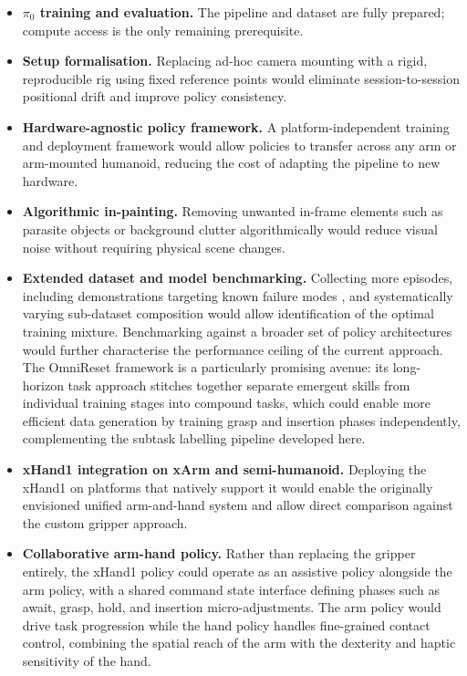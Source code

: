 \documentclass[conference]{IEEEtran}
\begin{document}
\begin{itemize}
    \item \textbf{$\pi_0$ training and evaluation.} The pipeline and dataset are fully prepared; compute access is the only remaining prerequisite.
    
    \item \textbf{Setup formalisation.} Replacing ad-hoc camera mounting with a rigid, reproducible rig using fixed reference points would eliminate session-to-session positional drift and improve policy consistency.

     \item \textbf{Hardware-agnostic policy framework.} A platform-independent training and deployment framework would allow policies to transfer across any arm or arm-mounted humanoid, reducing the cost of adapting the pipeline to new hardware.
    
    \item \textbf{Algorithmic in-painting.} Removing unwanted in-frame elements such as parasite objects or background clutter algorithmically would reduce visual noise without requiring physical scene changes.
    
    \item \textbf{Extended dataset and model benchmarking.} Collecting more episodes, including demonstrations targeting known failure modes , and systematically varying sub-dataset composition would allow identification of the optimal training mixture. Benchmarking against a broader set of policy architectures would further characterise the performance ceiling of the current approach. The OmniReset framework \cite{yin2026emergent} is a particularly promising avenue: its long-horizon task approach stitches together separate emergent skills from individual training stages into compound tasks, which could enable more efficient data generation by training grasp and insertion phases independently, complementing the subtask labelling pipeline developed here.
    
    \item \textbf{xHand1 integration on xArm and semi-humanoid.} Deploying the xHand1 on platforms that natively support it would enable the originally envisioned unified arm-and-hand system and allow direct comparison against the custom gripper approach.

    \item \textbf{Collaborative arm-hand policy.} Rather than replacing the gripper entirely, the xHand1 policy could operate as an assistive policy alongside the arm policy, with a shared command state interface defining phases such as await, grasp, hold, and insertion micro-adjustments. The arm policy would drive task progression while the hand policy handles fine-grained contact control, combining the spatial reach of the arm with the dexterity and haptic sensitivity of the hand.
    

\end{itemize}
\end{document}
